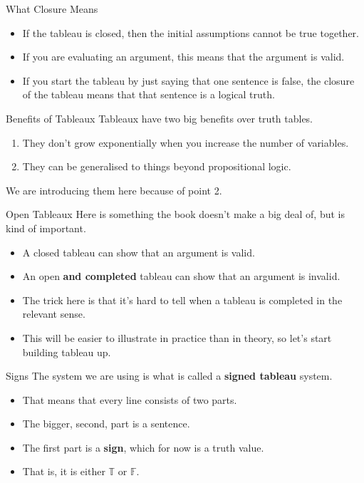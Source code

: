 \documentclass[
  ignorenonframetext,
]{beamer}
\providecommand{\tightlist}{%
  \setlength{\itemsep}{0pt}\setlength{\parskip}{0pt}}
\renewcommand{\,}{\text{, }}
\def\True{\mathbb{T}}
\def\False{\mathbb{F}}
\begin{document}
\begin{frame}{What Closure Means}
\protect\hypertarget{what-closure-means}{}
\begin{itemize}
\tightlist
\item
  If the tableau is closed, then the initial assumptions cannot be true
  together.
\item
  If you are evaluating an argument, this means that the argument is
  valid.\pause
\item
  If you start the tableau by just saying that one sentence is false,
  the closure of the tableau means that that sentence is a logical
  truth.
\end{itemize}
\end{frame}

\begin{frame}{Benefits of Tableaux}
\protect\hypertarget{benefits-of-tableaux}{}
Tableaux have two big benefits over truth tables.

\begin{enumerate}
\tightlist
\item
  They don't grow exponentially when you increase the number of
  variables.\pause
\item
  They can be generalised to things beyond propositional logic.
\end{enumerate}

We are introducing them here because of point 2.
\end{frame}

\begin{frame}{Open Tableaux}
\protect\hypertarget{open-tableaux}{}
Here is something the book doesn't make a big deal of, but is kind of
important.

\begin{itemize}
\tightlist
\item
  A closed tableau can show that an argument is valid.
\item
  An open \textbf{and completed} tableau can show that an argument is
  invalid.\pause
\item
  The trick here is that it's hard to tell when a tableau is completed
  in the relevant sense.
\item
  This will be easier to illustrate in practice than in theory, so let's
  start building tableau up.
\end{itemize}
\end{frame}

\begin{frame}{Signs}
\protect\hypertarget{signs}{}
The system we are using is what is called a \textbf{signed tableau}
system.

\begin{itemize}
\tightlist
\item
  That means that every line consists of two parts.
\item
  The bigger, second, part is a sentence.
\item
  The first part is a \textbf{sign}, which for now is a truth value.
\item
  That is, it is either \(\True\) or \(\False\).
\end{itemize}
\end{frame}
\end{document}
